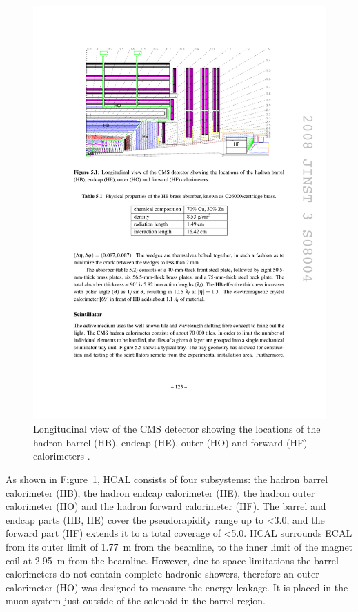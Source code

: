 \begin{figure}[htbp]
  \begin{center}
    \leavevmode
    \includegraphics[width=\columnwidth]{HCAL}
    \caption{Longitudinal view of the CMS detector showing the locations of the hadron barrel (HB), endcap (HE), outer
    (HO) and forward (HF) calorimeters \cite{CMS}.}
    \label{HCAL}
  \end{center}
\end{figure}

As shown in Figure~\ref{HCAL}, HCAL consists of four subsystems: the hadron barrel calorimeter (HB), the hadron endcap
calorimeter (HE), the hadron outer calorimeter (HO) and the hadron forward calorimeter (HF). The barrel and endcap parts
(HB, HE) cover the pseudorapidity range up to \abs\eta \num{<3.0}, and the forward part (HF) extends it to a total
coverage of \abs\eta \num{<5.0}. HCAL surrounds ECAL from its outer limit of \SI{1.77}{\metre} from the beamline, to the
inner limit of the magnet coil at \SI{2.95}{\metre} from the beamline. However, due to space limitations the barrel
calorimeters do not contain complete hadronic showers, therefore an outer calorimeter (HO) was designed to measure the
energy leakage. It is placed in the muon system just outside of the solenoid in the barrel region.


